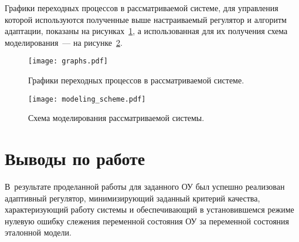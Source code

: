Графики переходных процессов в рассматриваемой системе, для управления которой используются полученные выше настраиваемый регулятор и алгоритм адаптации, показаны на рисунках~\ref{img_graphs}, а использованная для их получения схема моделирования~--- на рисунке~\ref{img_modeling_scheme}.

\begin{figure}[h!]
    \centering
    \texttt{[image: graphs.pdf]}
    \vspace{0cm}
    \caption{Графики переходных процессов в рассматриваемой системе.}
    \label{img_graphs}
\end{figure}


\begin{figure}[h!]
    \centering
    \texttt{[image: modeling\_scheme.pdf]}
    \vspace{0.5cm}
    \caption{Схема моделирования рассматриваемой системы.}
    \label{img_modeling_scheme}
\end{figure}

\newpage
\section{Выводы по работе}
В~результате проделанной работы для заданного ОУ был успешно реализован адаптивный регулятор, минимизирующий заданный критерий качества, характеризующий работу системы и обеспечивающий в установившемся режиме нулевую ошибку слежения переменной состояния ОУ за переменной состояния эталонной модели.
